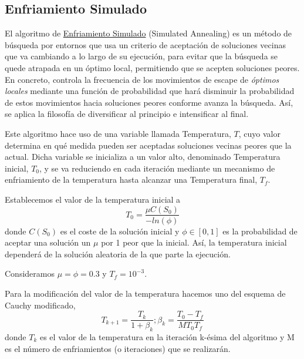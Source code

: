 \documentclass[11pt,a4paper]{article}
\begin{document}
\subsection{Enfriamiento Simulado}
El algoritmo de \underline{Enfriamiento Simulado} (Simulated Annealing) es un método de búsqueda por entornos que usa un criterio de aceptación de soluciones vecinas que va cambiando a lo largo de su ejecución, para evitar que la búsqueda se quede atrapada en un óptimo local, permitiendo que se acepten soluciones peores. En concreto, controla la frecuencia de los movimientos de escape de \textit{óptimos locales} mediante una función de probabilidad que hará disminuir la probabilidad de estos movimientos hacia soluciones peores conforme avanza la búsqueda. Así, se aplica la filosofía de diversificar al principio e intensificar al final.

Este algoritmo hace uso de una variable llamada Temperatura, $ T $, cuyo valor determina en qué medida pueden ser aceptadas soluciones vecinas peores que la actual. Dicha variable se inicializa a un valor alto, denominado
Temperatura inicial, $T_0$, y se va reduciendo en cada iteración mediante un mecanismo de enfriamiento de la temperatura hasta alcanzar una Temperatura final, $T_f$. 

Establecemos el valor de la temperatura inicial a $$T_0=\frac{\mu C(S_0)}{-ln(\phi)}$$
donde $ C(S_0) $ es el coste de la solución inicial y $ \phi \in [0,1] $ es la
probabilidad de aceptar una solución un $ \mu $ por 1 peor que la inicial. Así, la temperatura inicial dependerá de la solución aleatoria de la que parte la ejecución. 

Consideramos $\mu=\phi=0.3$ y $T_f=10^{-3}$. 

Para la modificación del valor de la temperatura hacemos uno del esquema de Cauchy modificado, 
$$T_{k+1}=\frac{T_k}{1+\beta_k}; \beta_k=\frac{T_0-T_f}{MT_0T_f}$$
donde $T_k$ es el valor de la temperatura en la iteración k-ésima del algoritmo y M es el número de enfriamientos (o iteraciones) que se realizarán. 
\end{document}
